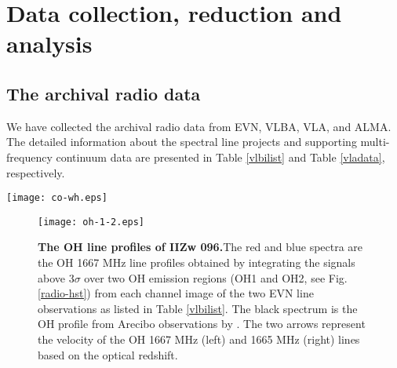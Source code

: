 \documentclass[]{aa} %
\begin{document}

\section{Data collection, reduction and analysis}
\label{sect:Obs}
\subsection{The archival radio data}
We have collected the archival radio data from EVN, VLBA, VLA, and ALMA. The detailed information about the spectral line projects and supporting multi-frequency continuum data are presented in Table \ref{vlbilist} and Table \ref{vladata}, respectively.

 \begin{figure*}
   \centering
\texttt{[image: co-wh.eps]}
      \caption{I: The HST-ACS F814W image (grey scale) for IIZw 096. The green crosses indicate the bright spots in this optical image. II: VLA (A configuration) contour map at 33 GHz (white line) are overlaid on the HST image;  the contour levels are 0.0000441 $\times$ (1, 2, 4, 8) Jy/beam and the Beam FWHM: 82.4 $\times$ 59.5 (mas) at -69.1$^{\circ}$. The red circles stand for the regions around the D1 component and the radius is about 0.1 arcsec. The red contour stands for the OH megamaser emission (red) from EVN archival data (project ES064B). The details about image parameters of the OH emission are present in Fig. \ref{EVN2line}. III: The zoomed map of D1 region from II. The yellow ellipses are the two regions where we extracted the integrated OH emission lines.}
    \label{radio-hst}%
\end{figure*}


\begin{figure}
   \centering
  \texttt{[image: oh-1-2.eps]}
      \caption{\textbf{The OH line profiles of IIZw 096.}The red and blue spectra are the  OH 1667 MHz line profiles obtained by integrating the signals above 3$\sigma$  over two OH emission regions (OH1 and OH2, see Fig. \ref{radio-hst}) from each channel image of the two EVN line observations as listed in Table \ref{vlbilist}. The black spectrum is the OH profile from Arecibo observations by \cite{1989ApJ...346..680B}. The two arrows represent the velocity of the OH 1667 MHz (left) and 1665 MHz (right) lines based on the optical redshift.}
      \label{evnspectrum}
\end{figure}
\end{document}
